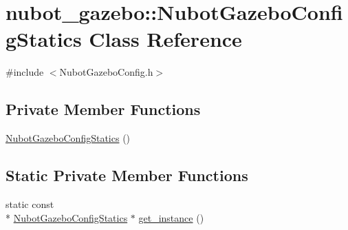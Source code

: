 \hypertarget{classnubot__gazebo_1_1NubotGazeboConfigStatics}{\section{nubot\-\_\-gazebo\-:\-:Nubot\-Gazebo\-Config\-Statics Class Reference}
\label{classnubot__gazebo_1_1NubotGazeboConfigStatics}
}


{\ttfamily \#include $<$Nubot\-Gazebo\-Config.\-h$>$}

\subsection*{Private Member Functions}
\begin{DoxyCompactItemize}
\item 
\hyperlink{classnubot__gazebo_1_1NubotGazeboConfigStatics_a04ccfc3c59e2a23d7787cd558d30eb44}{Nubot\-Gazebo\-Config\-Statics} ()
\end{DoxyCompactItemize}
\subsection*{Static Private Member Functions}
\begin{DoxyCompactItemize}
\item 
static const \\*
\hyperlink{classnubot__gazebo_1_1NubotGazeboConfigStatics}{Nubot\-Gazebo\-Config\-Statics} $\ast$ \hyperlink{classnubot__gazebo_1_1NubotGazeboConfigStatics_a477628c56bde31c35660b628ce7d1de7}{get\-\_\-instance} ()
\end{DoxyCompactItemize}
